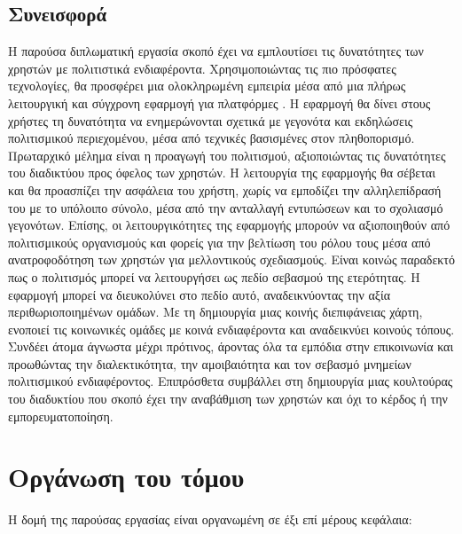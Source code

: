 \subsection{Συνεισφορά}

Η παρούσα διπλωματική εργασία σκοπό έχει να εμπλουτίσει τις δυνατότητες των χρηστών με πολιτιστικά ενδιαφέροντα. Χρησιμοποιώντας τις πιο πρόσφατες τεχνολογίες, θα προσφέρει μια ολοκληρωμένη εμπειρία μέσα από μια πλήρως λειτουργική και σύγχρονη εφαρμογή για πλατφόρμες . Η εφαρμογή θα δίνει στους χρήστες τη δυνατότητα να ενημερώνονται σχετικά με γεγονότα και εκδηλώσεις πολιτισμικού περιεχομένου, μέσα από τεχνικές βασισμένες στον πληθοπορισμό. Πρωταρχικό μέλημα είναι η προαγωγή του πολιτισμού, αξιοποιώντας τις δυνατότητες του διαδικτύου προς όφελος των χρηστών. Η λειτουργία της εφαρμογής θα σέβεται και θα προασπίζει την ασφάλεια του χρήστη, χωρίς να εμποδίζει την αλληλεπίδρασή του με το υπόλοιπο σύνολο, μέσα από την ανταλλαγή εντυπώσεων και το σχολιασμό γεγονότων. Επίσης, οι λειτουργικότητες της εφαρμογής μπορούν να αξιοποιηθούν από πολιτισμικούς οργανισμούς και φορείς για την βελτίωση του ρόλου τους μέσα από ανατροφοδότηση των χρηστών για μελλοντικούς σχεδιασμούς. 
\newline
\indent
Είναι κοινώς παραδεκτό πως ο πολιτισμός μπορεί να λειτουργήσει ως πεδίο σεβασμού της ετερότητας. H εφαρμογή μπορεί να διευκολύνει στο πεδίο αυτό, αναδεικνύοντας την αξία περιθωριοποιημένων ομάδων. Με τη δημιουργία μιας κοινής διεπιφάνειας χάρτη, ενοποιεί τις κοινωνικές ομάδες με κοινά ενδιαφέροντα και αναδεικνύει κοινούς τόπους. Συνδέει άτομα άγνωστα μέχρι πρότινος, άροντας όλα τα εμπόδια στην επικοινωνία και προωθώντας την διαλεκτικότητα, την αμοιβαιότητα και τον σεβασμό μνημείων πολιτισμικού ενδιαφέροντος. Επιπρόσθετα συμβάλλει στη δημιουργία μιας κουλτούρας του διαδυκτίου που σκοπό έχει την αναβάθμιση των χρηστών και όχι το κέρδος ή την εμπορευματοποίηση. 



\section{Οργάνωση του τόμου}
Η δομή της παρούσας εργασίας είναι οργανωμένη σε έξι επί μέρους κεφάλαια:

